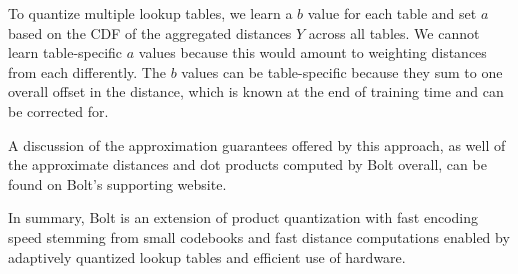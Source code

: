 To quantize multiple lookup tables, we learn a $b$ value for each table and set $a$ based on the CDF of the aggregated distances $Y$ across all tables. We cannot learn table-specific $a$ values because this would amount to weighting distances from each differently. The $b$ values can be table-specific because they sum to one overall offset in the distance, which is known at the end of training time and can be corrected for.

A discussion of the approximation guarantees offered by this approach, as well of the approximate distances and dot products computed by Bolt overall, can be found on Bolt's supporting website. %











In summary, Bolt is an extension of product quantization with fast encoding speed stemming from small codebooks and fast distance computations enabled by adaptively quantized lookup tables and efficient use of hardware.






